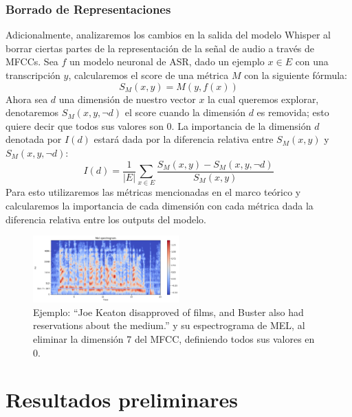 \documentclass[conference]{IEEEtran}
\begin{document}
\subsubsection{Borrado de Representaciones}
Adicionalmente, analizaremos los cambios en la salida del modelo Whisper al borrar ciertas partes de la representación de la señal de audio a través de MFCCs.
Sea $f$ un modelo neuronal de ASR, dado un ejemplo $x \in E$ con una transcripción $y$, calcularemos el score de una métrica $M$ con la siguiente fórmula:
\begin{equation}
    S_{M}(x,y) = M(y, f(x))
\end{equation}
Ahora sea $d$ una dimensión de nuestro vector $x$ la cual queremos explorar, denotaremos $S_{M}(x,y,\neg d)$ el score cuando la dimensión $d$ es removida; esto quiere decir que todos sus valores son 0.
La importancia de la dimensión $d$ denotada por $I(d)$ estará dada por la diferencia relativa entre $S_{M}(x,y)$ y $S_{M}(x,y,\neg d)$:
\begin{equation} \label{eq:imp}
    I(d) = \frac{1}{|E|} \sum_{x \in E} \frac{S_{M}(x,y) - S_{M}(x,y,\neg d)}{S_{M}(x,y)}
\end{equation}
Para esto utilizaremos las métricas mencionadas en el marco teórico y calcularemos la importancia de cada dimensión con cada métrica dada la diferencia relativa entre los outputs del modelo.

\begin{figure}[H]
\centering
\includegraphics[width=0.5\textwidth]{images/mel_erasure.png}
\caption{Ejemplo: “Joe Keaton disapproved of films, and Buster also had reservations about the medium.” y su espectrograma de MEL, al eliminar la dimensión 7 del MFCC, definiendo todos sus valores en 0.}
\end{figure}

\section{Resultados preliminares}
\end{document}
